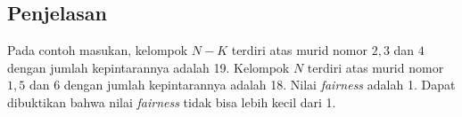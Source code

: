 \documentclass{article}
\begin{document}
\subsection*{Penjelasan}
Pada contoh masukan, kelompok $N-K$ terdiri atas murid nomor $2, 3$ dan $4$ dengan jumlah kepintarannya adalah 19. Kelompok $N$ terdiri atas murid nomor $1, 5$ dan $6$ dengan jumlah kepintarannya adalah 18. Nilai \textit{fairness} adalah 1. Dapat dibuktikan bahwa nilai \textit{fairness} tidak bisa lebih kecil dari 1.  
\end{document}
